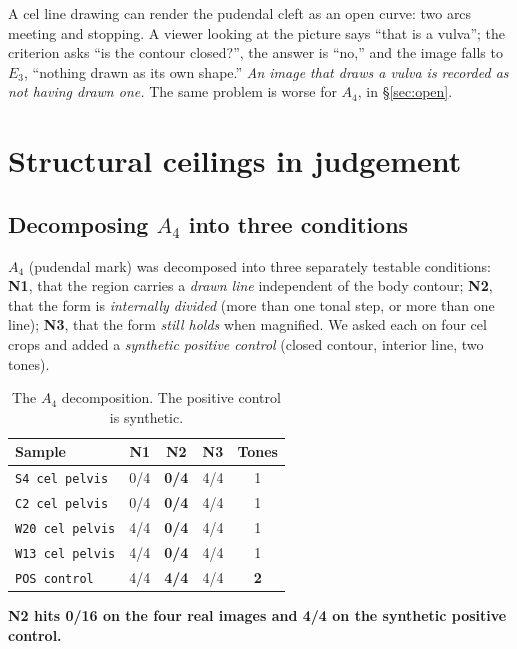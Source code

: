 \documentclass[11pt]{article}
\newcommand{\axe}{E}
\begin{document}
A cel line drawing can render the pudendal cleft as an open curve: two arcs
meeting and stopping. A viewer looking at the picture says ``that is a vulva'';
the criterion asks ``is the contour closed?'', the answer is ``no,'' and the
image falls to $\axe_3$, ``nothing drawn as its own shape.'' \emph{An image
that draws a vulva is recorded as not having drawn one.} The same problem is
worse for $A_4$, in \S\ref{sec:open}.

\section{Structural ceilings in judgement}
\label{sec:ceilings}

\subsection{Decomposing $A_4$ into three conditions}
\label{sec:n123}

$A_4$ (pudendal mark) was decomposed into three separately testable
conditions: \textbf{N1}, that the region carries a \emph{drawn line} independent
of the body contour; \textbf{N2}, that the form is \emph{internally divided}
(more than one tonal step, or more than one line); \textbf{N3}, that the form
\emph{still holds} when magnified. We asked each on four cel crops and added a
\emph{synthetic positive control} (closed contour, interior line, two tones).

\begin{table}[H]
\centering\small
\begin{tabular}{@{}lcccc@{}}
\toprule
Sample & N1 & N2 & N3 & Tones \\
\midrule
\texttt{S4 cel pelvis}  & 0/4 & \textbf{0/4} & 4/4 & 1 \\
\texttt{C2 cel pelvis}  & 0/4 & \textbf{0/4} & 4/4 & 1 \\
\texttt{W20 cel pelvis} & 4/4 & \textbf{0/4} & 4/4 & 1 \\
\texttt{W13 cel pelvis} & 4/4 & \textbf{0/4} & 4/4 & 1 \\
\texttt{POS control}    & 4/4 & \textbf{4/4} & 4/4 & \textbf{2} \\
\bottomrule
\end{tabular}
\caption{The $A_4$ decomposition. The positive control is synthetic.}
\label{tab:n123}
\end{table}

\textbf{N2 hits 0/16 on the four real images and 4/4 on the synthetic positive
control.}
\end{document}

